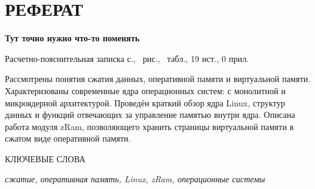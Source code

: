 \section*{РЕФЕРАТ}

\textbf{Тут точно нужно что-то поменять}

Расчетно-пояснительная записка \pageref{LastPage} с., \totalfigures\ рис., \totaltables\ табл., 19 ист., 0 прил.

Рассмотрены понятия сжатия данных, оперативной памяти и виртуальной памяти. Характеризованы современные ядра операционных систем: с монолитной и микроядерной архитектурой. Проведён краткий обзор ядра Linux, структур данных и функций отвечающих за управление памятью внутри ядра. Описана работа модуля zRam, позволяющего хранить страницы виртуальной памяти в сжатом виде оперативной памяти.

КЛЮЧЕВЫЕ СЛОВА

\textit{сжатие, оперативная память, Linux, zRam, операционные системы}

\pagebreak